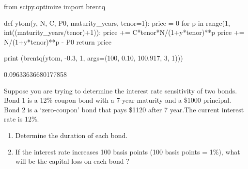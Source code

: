 \cprotEnv\begin{solution}
\begin{ipython}
from scipy.optimize import brentq

def ytom(y, N, C, P0, maturity_years, tenor=1): 
    price = 0
    for p in range(1, int((maturity_years/tenor)+1)):
        price += C*tenor*N/(1+y*tenor)**p
    price += N/(1+y*tenor)**p - P0 
    return price

print (brentq(ytom, -0.3, 1, args=(100, 0.10, 100.917, 3, 1)))
\end{ipython}
\begin{ioutput}
0.09633636680177858
\end{ioutput}    
\end{solution}

\begin{question}
Suppose you are trying to determine the interest rate sensitivity of two bonds. Bond 1 is a 12\% coupon bond with a 7-year maturity and a \$1000 principal. Bond 2 is a ‘zero-coupon’ bond that pays \$1120 after 7 year.The current interest rate is 12\%.
\begin{enumerate}
\item Determine the duration of each bond.
\item If the interest rate increases 100 basis points (100 basis points = 1\%), what will be the capital loss on each bond ?
\end{enumerate}
\end{question}

